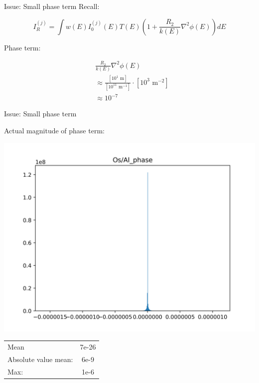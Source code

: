 \documentclass[presentation]{beamer}
\begin{document}
  \begin{frame}{Issue: Small phase term}
    Recall: 

    \begin{equation}
      I_R^{(j)} = \int w(E) I_0^{(j)}(E) T(E) \left(1 + \frac{R_2}{k(E)} \nabla^2 \phi(E)\right)dE
    \end{equation}

    Phase term:
    
    \begin{align}
      &\frac{R_2}{k(E)}\nabla^2 \phi(E)\\
      &\approx \frac{[10^1 \text{ m}]}{[10^{11} \text{ m}^{-1}]}\cdot [10^{3} \text{ m}^{-2}]\\
      &\approx 10^{-7}
    \end{align}
    
  \end{frame}

  \begin{frame}{Issue: Small phase term}

    Actual magnitude of phase term:

    \centering
    \includegraphics[width=0.8\linewidth]{figs/Al_phase}

  \begin{tabular}{l | c }
    Mean & 7e-26\\
    Absolute value mean: & 6e-9\\
    Max: & 1e-6\\
  \end{tabular}  

    
  \end{frame}
\end{document}
